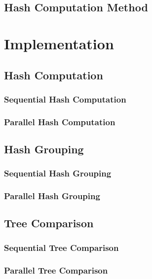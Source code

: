 \documentclass[letterpaper,12pt]{article}
\theoremstyle{remark}
\begin{document}
\subsection{Hash Computation Method}


      


\section*{Implementation}
\subsection{Hash Computation}
\subsubsection{Sequential Hash Computation}
\subsubsection{Parallel Hash Computation}
\subsection{Hash Grouping}
\subsubsection{Sequential Hash Grouping}
\subsubsection{Parallel Hash Grouping}
\subsection{Tree Comparison}
\subsubsection{Sequential Tree Comparison}
\subsubsection{Parallel Tree Comparison}
\end{document}
